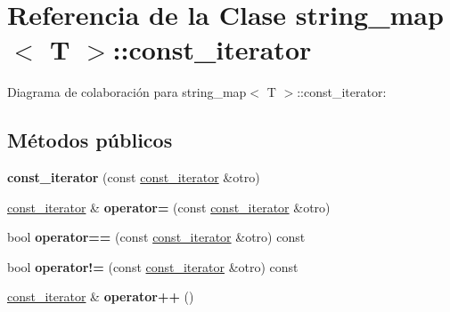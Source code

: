 \hypertarget{classstring__map_1_1const__iterator}{\section{Referencia de la Clase string\+\_\+map$<$ T $>$\+:\+:const\+\_\+iterator}
\label{classstring__map_1_1const__iterator}
}


Diagrama de colaboración para string\+\_\+map$<$ T $>$\+:\+:const\+\_\+iterator\+:
\subsection*{Métodos públicos}
\begin{DoxyCompactItemize}
\item 
\hypertarget{classstring__map_1_1const__iterator_ac443d13e2194a47e993ba267d60902c5}{{\bfseries const\+\_\+iterator} (const \hyperlink{classstring__map_1_1const__iterator}{const\+\_\+iterator} \&otro)}\label{classstring__map_1_1const__iterator_ac443d13e2194a47e993ba267d60902c5}

\item 
\hypertarget{classstring__map_1_1const__iterator_aab987fdaccae6a10ec1d7202ba5eab9f}{\hyperlink{classstring__map_1_1const__iterator}{const\+\_\+iterator} \& {\bfseries operator=} (const \hyperlink{classstring__map_1_1const__iterator}{const\+\_\+iterator} \&otro)}\label{classstring__map_1_1const__iterator_aab987fdaccae6a10ec1d7202ba5eab9f}

\item 
\hypertarget{classstring__map_1_1const__iterator_a4b12fa243ac222ee2e08dbe8f3e2b6f5}{bool {\bfseries operator==} (const \hyperlink{classstring__map_1_1const__iterator}{const\+\_\+iterator} \&otro) const }\label{classstring__map_1_1const__iterator_a4b12fa243ac222ee2e08dbe8f3e2b6f5}

\item 
\hypertarget{classstring__map_1_1const__iterator_a2c8261a3b6280dcff710d0a37a95e8e8}{bool {\bfseries operator!=} (const \hyperlink{classstring__map_1_1const__iterator}{const\+\_\+iterator} \&otro) const }\label{classstring__map_1_1const__iterator_a2c8261a3b6280dcff710d0a37a95e8e8}

\item 
\hypertarget{classstring__map_1_1const__iterator_a89c1052c14532e8a7ef1e0bb5846b27a}{\hyperlink{classstring__map_1_1const__iterator}{const\+\_\+iterator} \& {\bfseries operator++} ()}\label{classstring__map_1_1const__iterator_a89c1052c14532e8a7ef1e0bb5846b27a}


\end{DoxyCompactItemize}

